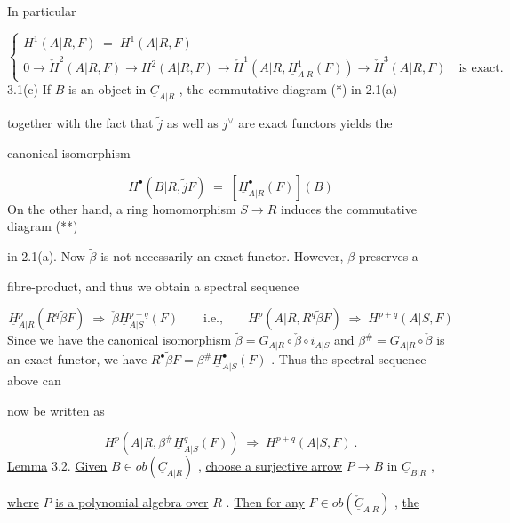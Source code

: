 In particular

\begin{equation*}
\left\{
\begin{array}{l}
H^{1}(A|R,F) \;=\; H^{1}(A|R,F) \\[2ex]
0 \to \check{H}^{2}(A|R,F) \to H^{2}(A|R,F) \to \check{H}^{1}(A|R,\underline{H}^{1}_{A\ R}(F)) \to \check{H}^{3}(A|R,F) \quad \text{is exact.}
\end{array}
\right.
\end{equation*}
3.1(c)   If  $B$  is an object in  $\underline{C}_{A|R}$  , the commutative diagram (*) in 2.1(a)

together with the fact that  $\tilde{j}$  as well as  $j^{\vee}$  are exact functors yields the

canonical isomorphism

\begin{equation*}
H^{\bullet}(B|R,\tilde{j}F) \;=\; [\underline{H}^{\bullet}_{A|R}(F)](B)
\end{equation*}
On the other hand, a ring homomorphism  $S → R$  induces the commutative diagram (**)

in 2.1(a). Now  $\tilde{\beta}$  is not necessarily an exact functor. However,  $β$  preserves a

fibre-product, and thus we obtain a spectral sequence

\begin{equation*}
\underline{H}^{p}_{A|R}(R^{q}\tilde{\beta}F) \;\Rightarrow\; \check{\beta}\underline{H}^{p+q}_{A|S}(F) \qquad \text{i.e.,} \qquad H^{p}(A|R,R^{q}\tilde{\beta}F) \;\Rightarrow\; H^{p+q}(A|S,F)
\end{equation*}
Since we have the canonical isomorphism  $\tilde{\beta} = G_{A|R}\circ\check{\beta}\circ i_{A|S}$  and  $\beta^{\#} = G_{A|R}\circ\check{\beta}$  is an
exact functor, we have  $R^{\bullet}\tilde{\beta}F = \beta^{\#}\underline{H}^{\bullet}_{A|S}(F)$  . Thus the spectral sequence above can

now be written as

\begin{equation*}
H^{p}(A|R,\beta^{\#}\underline{H}^{q}_{A|S}(F)) \;\Rightarrow\; H^{p+q}(A|S,F) \ .
\end{equation*}
\underline{Lemma} 3.2.  \underline{Given}  $B \in ob(\underline{C}_{A|R})$  , \underline{choose a surjective arrow}  $P → B$  in  $\underline{C}_{B|R}$  ,

\underline{where}  $P$  \underline{is a polynomial algebra over}  $R$  . \underline{Then for any}  $F \in ob(\check{\underline{C}}_{A|R})$  , \underline{the}

